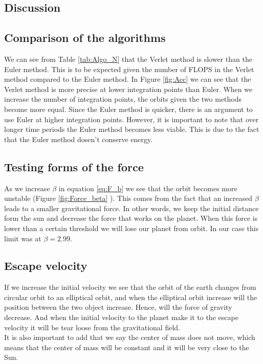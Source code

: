 \documentclass{article}
\begin{document}
\begin{multicols}{2}
\section{Discussion}

\subsection{Comparison of the algorithms}

We can see from Table \ref{tab:Algo_N} that the Verlet method is slower than the Euler method. This is to be expected given the number of FLOPS in the Verlet method compared to the Euler method. In Figure \ref{fig:Acc} we can see that the Verlet method is more precise at lower integration points than Euler. When we increase the number of integration points, the orbits given the two methods become more equal. Since the Euler method is quicker, there is an argument to use Euler at higher integration points. However, it is important to note that over longer time periods the Euler method becomes less viable. This is due to the fact that the Euler method dosen't conserve energy. 

\subsection{Testing forms of the force}

As we increase $\beta$ in equation \ref{eq:F_b} we see that the orbit becomes more unstable (Figure \ref{fig:Force_beta} ). This comes from the fact that an increased $\beta$ leads to a smaller gravitational force. In other words, we keep the initial distance form the sun and decrease the force that works on the planet. When this force is lower than a certain threshold we will lose our planet from orbit. In our case this limit was at $\beta=2.99$.  

\subsection{Escape velocity}
If we increase the initial velocity we see that the orbit of the earth changes from circular orbit to an elliptical orbit, and when the elliptical orbit increase will the position between the two object increase. Hence, will the force of gravity decrease. And when the initial velocity to the planet make it to the escape velocity it will be tear loose from the gravitational field.\\
It is also important to add that we say the center of mass does not move, which means that the center of mass will be constant and it will be very close to the Sun.  


\end{multicols}
\end{document}
